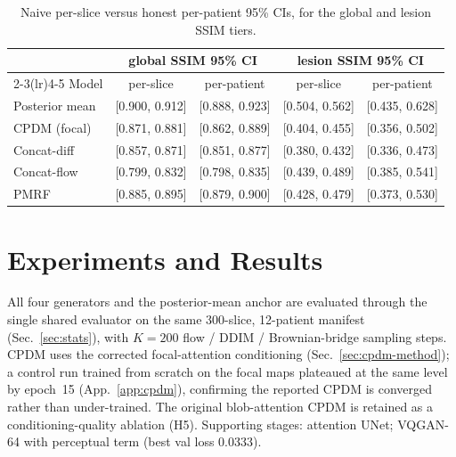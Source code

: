 \documentclass[11pt,a4paper]{article}
\newcommand{\num}[1]{#1}
\begin{document}
\begin{table}[h]\centering\footnotesize
\setlength{\tabcolsep}{4pt}
\caption{Naive per-slice versus honest per-patient 95\% CIs, for the global and lesion SSIM tiers.}
\label{tab:ci-compare}
\begin{tabular}{l cc cc}
\toprule
& \multicolumn{2}{c}{global SSIM 95\% CI} & \multicolumn{2}{c}{lesion SSIM 95\% CI} \\
\cmidrule(lr){2-3}\cmidrule(lr){4-5}
Model & per-slice & per-patient & per-slice & per-patient \\
\midrule
Posterior mean & [0.900, 0.912] & [0.888, 0.923] & [0.504, 0.562] & [0.435, 0.628] \\
CPDM (focal)   & [0.871, 0.881] & [0.862, 0.889] & [0.404, 0.455] & [0.356, 0.502] \\
Concat-diff    & [0.857, 0.871] & [0.851, 0.877] & [0.380, 0.432] & [0.336, 0.473] \\
Concat-flow    & [0.799, 0.832] & [0.798, 0.835] & [0.439, 0.489] & [0.385, 0.541] \\
PMRF           & [0.885, 0.895] & [0.879, 0.900] & [0.428, 0.479] & [0.373, 0.530] \\
\bottomrule
\end{tabular}
\end{table}

\section{Experiments and Results}
\label{sec:results}
All four generators and the posterior-mean anchor are evaluated through the single shared
evaluator on the same \num{300}-slice, \num{12}-patient manifest (Sec.~\ref{sec:stats}), with
$K{=}200$ flow / DDIM / Brownian-bridge sampling steps. CPDM uses the corrected focal-attention
conditioning (Sec.~\ref{sec:cpdm-method}); a control run trained from scratch on the
focal maps plateaued at the same level by epoch~15 (App.~\ref{app:cpdm}), confirming the
reported CPDM is converged rather than under-trained. The original blob-attention CPDM is
retained as a conditioning-quality ablation (H5). Supporting stages: attention UNet; VQGAN-64
with perceptual term (best val loss \num{0.0333}).
\end{document}

